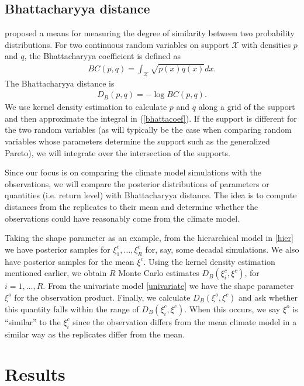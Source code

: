 \documentclass[12pt]{article}
\begin{document}
\subsection{Bhattacharyya distance}
\label{bhatta}

\cite{bhattacharyya1943measure} proposed a means for measuring the degree of similarity between two probability distributions. For two continuous random variables on support $\mathcal{X}$ with densities $p$ and $q$, the Bhattacharyya coefficient is defined as
\begin{align}
BC(p,q)=\int_\mathcal{X} \sqrt{p(x)q(x)} dx. \label{bhattacoef}
\end{align}
The Bhattacharyya distance is 
\begin{align}
D_B(p,q)=-\log BC(p,q).
\end{align}
We use kernel density estimation to calculate $p$ and $q$ along a grid of the support and then approximate the integral in (\ref{bhattacoef}). If the support is different for the two random variables (as will typically be the case when comparing random variables whose parameters determine the support such as the generalized Pareto), we will integrate over the intersection of the supports.

Since our focus is on comparing the climate model simulations with the observations, we will compare the posterior distributions of parameters or quantities (i.e. return level) with Bhattacharyya distance. The idea is to compute distances from the replicates to their mean and determine whether the observations could have reasonably come from the climate model.

Taking the shape parameter as an example, from the hierarchical model in \ref{hier} we have posterior samples for $\xi_1^c,\ldots,\xi_R^c$ for, say, some decadal simulations. We also have posterior samples for the mean $\xi^c$. Using the kernel density estimation mentioned earlier, we obtain $R$ Monte Carlo estimates $D_B(\xi_i^c, \xi^c)$, for $i=1,\ldots,R$. From the univariate model \ref{univariate} we have the shape parameter $\xi^o$ for the observation product. Finally, we calculate $D_B(\xi^o, \xi^c)$ and ask whether this quantity falls within the range of $D_B(\xi_i^c, \xi^c)$. When this occurs, we say $\xi^o$ is ``similar'' to the $\xi_i^c$ since the observation differs from the mean climate model in a similar way as the replicates differ from the mean.

\section{Results}
\label{results}
\end{document}
